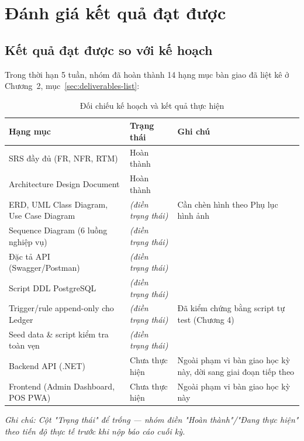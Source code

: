 \section{Đánh giá kết quả đạt được}

\subsection{Kết quả đạt được so với kế hoạch}
Trong thời hạn 5 tuần, nhóm đã hoàn thành 14 hạng mục bàn giao đã liệt kê ở Chương~2, mục~\ref{sec:deliverables-list}:

\begin{table}[htbp]
    \centering
    \small
    \caption{Đối chiếu kế hoạch và kết quả thực hiện}
    \begin{tabularx}{\textwidth}{|Y|p{2.2cm}|Y|}
        \hline
        \textbf{Hạng mục} & \textbf{Trạng thái} & \textbf{Ghi chú} \\
        \hline
        SRS đầy đủ (FR, NFR, RTM) & Hoàn thành & \\
        \hline
        Architecture Design Document & Hoàn thành & \\
        \hline
        ERD, UML Class Diagram, Use Case Diagram & \textit{(điền trạng thái)} & Cần chèn hình theo Phụ lục hình ảnh \\
        \hline
        Sequence Diagram (6 luồng nghiệp vụ) & \textit{(điền trạng thái)} & \\
        \hline
        Đặc tả API (Swagger/Postman) & \textit{(điền trạng thái)} & \\
        \hline
        Script DDL PostgreSQL & \textit{(điền trạng thái)} & \\
        \hline
        Trigger/rule append-only cho Ledger & \textit{(điền trạng thái)} & Đã kiểm chứng bằng script tự test (Chương 4) \\
        \hline
        Seed data \& script kiểm tra toàn vẹn & \textit{(điền trạng thái)} & \\
        \hline
        Backend API (.NET) & Chưa thực hiện & Ngoài phạm vi bàn giao học kỳ này, dời sang giai đoạn tiếp theo \\
        \hline
        Frontend (Admin Dashboard, POS PWA) & Chưa thực hiện & Ngoài phạm vi bàn giao học kỳ này \\
        \hline
    \end{tabularx}
\end{table}

\textit{Ghi chú: Cột "Trạng thái" để trống — nhóm điền "Hoàn thành"/"Đang thực hiện" theo tiến độ thực tế trước khi nộp báo cáo cuối kỳ.}

